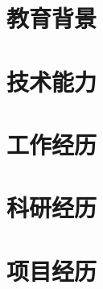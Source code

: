 \documentclass[zh]{resume}
\begin{document}

\newcommand{\equalcontrib}{$^{\dagger}$}




\section{教育背景}





\section{技术能力}




\section{工作经历}





\section{科研经历}




\section{项目经历}




\end{document}
